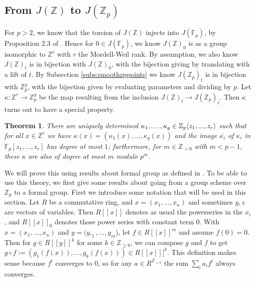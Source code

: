 \documentclass[12pt]{article}
\newcommand{\Z}{\mathbb{Z}}
\newcommand{\F}{\mathbb{F}}
\renewcommand{\angle}[1]{\hspace{-2pt}\left\langle #1 \right\rangle}
\theoremstyle{plain}
\newtheorem{thm}{Theorem}[section] %
\theoremstyle{definition}
\theoremstyle{remark}
\begin{document}
\subsection{From \texorpdfstring{$J(\Z)$}{J(Z)} to \texorpdfstring{$J(\Z_p)$}{J(Z\_p)}}
For $p > 2$, we know that the torsion of $J(\Z)$ injects into $J(\F_p)$, by Proposition 2.3 of \cite{pierre2000}. Hence for $0 \in J(\F_p)$, we know $J(\Z)_0$ is as a group isomorphic to $\Z^r$ with $r$ the Mordell-Weil rank. By assumption, we also know $J(\Z)_t$ is in bijection with $J(\Z)_0$, with the bijection giving by translating with a lift of $t$. By Subsection \ref{subs:smoothzppoints} we know $J(\Z_p)_t$ is in bijection with $\Z_p^{g}$, with the bijection given by evaluating parameters and dividing by $p$. Let $\kappa: \Z^r \to \Z_p^g$ be the map resulting from the inclusion $J(\Z)_t \to J(\Z_p)_t$. Then $\kappa$ turns out to have a special property.

\begin{thm}
\label{thm:kappanice}
There are uniquely determined $\kappa_1,\dots,\kappa_g \in \Z_p\angle{z_1,...,z_r}$ such that for all $x \in \Z^r$ we have $\kappa(x) = (\kappa_1(x),\dots,\kappa_g(x))$ and the image $\overline{\kappa_i}$ of $\kappa_i$ in $\F_p[z_1,...,z_r]$ has degree at most $1$; furthermore, for $m \in \Z_{>0}$ with $m<p-1$, these $\kappa$ are also of degree at most $m$ modulo $p^m$.
\end{thm}

We will prove this using results about formal group as defined in \citep{honda70}. To be able to use this theory, we first give some results about going from a group scheme over $\Z_p$ to a formal group.
First we introduce some notation that will be used in this section. Let $R$ be a commutative ring, and $x = (x_1,\dots,x_n)$ and sometimes $y,z$ are vectors of variables. Then $R[[x]]$ denotes as usual the powerseries in the $x_i$, and $R[[x]]_0$ denotes those power series with constant term $0$. With $x = (x_1,\dots,x_n)$ and $y = (y,_1,\dots,y_m$), let $f \in R[[x]]^m$ and assume $f(0) = 0$. Then for $g \in R[[y]]^k$ for some $k\in\Z_{\geq 0}$, we can compose $g$ and $f$ to get $g\circ f := (g_1(f(x)),\dots,g_k(f(x)))\in R[[x]]]^k$. This definition makes sense because $f^i$ converges to $0$, so for any $a \in R^{\Z_{\geq 0}} $ the sum $\sum_i a_i f^i$ always converges. 
\end{document}
